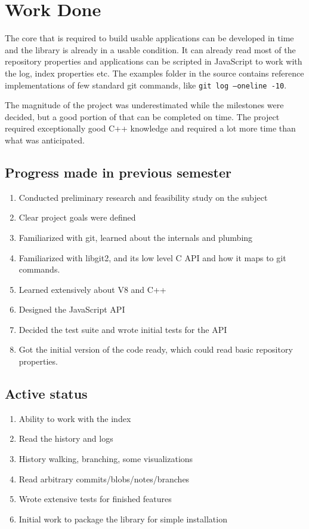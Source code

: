 \chapter{Work Done}

The core that is required to build usable applications can be developed in time
and the library is already in a usable condition. It can already read most of
the repository properties and applications can be scripted in JavaScript to work
with the log, index properties etc. The examples folder in the source contains
reference implementations of few standard git commands, like \texttt{git log
  --oneline -10}.

The magnitude of the project was underestimated while the milestones were
decided, but a good portion of that can be completed on time. The project
required exceptionally good C++ knowledge and required a lot more time than what
was anticipated.

\section{Progress made in previous semester}

\begin{enumerate}

	\item Conducted preliminary research and feasibility study on the subject
	\item Clear project goals were defined
	\item Familiarized with git, learned about the internals and plumbing
    \item Familiarized with libgit2, and its low level C API and how it maps to
      git commands.
    \item Learned extensively about V8 and C++
    \item Designed the JavaScript API
    \item Decided the test suite and wrote initial tests for the API
    \item Got the initial version of the code ready, which could read basic
      repository properties.

\end{enumerate}

\section{Active status}

\begin{enumerate}

	\item Ability to work with the index
    \item Read the history and logs
    \item History walking, branching, some visualizations
    \item Read arbitrary commits/blobs/notes/branches
    \item Wrote extensive tests for finished features
    \item Initial work to package the library for simple installation

\end{enumerate}


